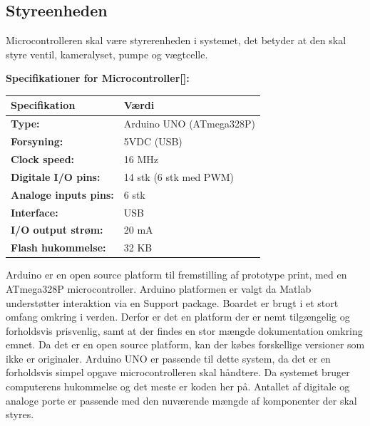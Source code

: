 

 
\newpage
\subsection{Styreenheden}
Microcontrolleren skal være styrerenheden i systemet, det betyder at den skal styre ventil, kameralyset, pumpe og vægtcelle.  

\textbf{Specifikationer for Microcontroller[\citet{DH3}]:} 
\begin{center}
		\begin{longtable}{ | m{6.5cm} | m{6.5cm}| } 
			\hline
			\textbf{Specifikation} &\textbf{Værdi} \\ 
			\hline
			\textbf{Type:} & Arduino UNO (ATmega328P) \\ 
			\hline
			\textbf{Forsyning:} & 5VDC (USB)  \\ 
			\hline
			\textbf{Clock speed:} & 16 MHz  \\ 
			\hline		
			\textbf{Digitale I/O pins:} & 14 stk (6 stk med PWM)  \\ 
			\hline	
			\textbf{Analoge inputs pins:} & 6 stk  \\ 
			\hline	
			\textbf{Interface:} & USB  \\ 
			\hline	
			\textbf{I/O output strøm:} & 20 mA  \\ 
			\hline
			\textbf{Flash hukommelse:} & 32 KB  \\ 
			\hline	
		\end{longtable}
\end{center}
Arduino er en open source platform til fremstilling af prototype print, med en ATmega328P microcontroller. Arduino platformen er valgt da Matlab understøtter interaktion via en Support package. Boardet er brugt i et stort omfang omkring i verden. Derfor er det en platform der er nemt tilgængelig og forholdsvis prisvenlig, samt at der findes en stor mængde dokumentation omkring emnet. Da det er en open source platform, kan der købes forskellige versioner som ikke er originaler. Arduino UNO er passende til dette system, da det er en forholdsvis simpel opgave microcontrolleren skal håndtere. Da systemet bruger computerens hukommelse og det meste er koden her på. Antallet af digitale og analoge porte er passende med den nuværende mængde af komponenter der skal styres. 


